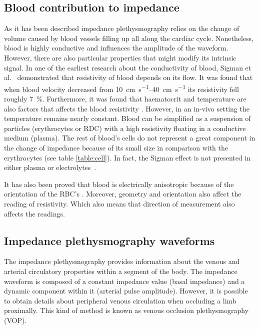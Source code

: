 \subsection{Blood contribution to impedance} %
As it has been described impedance plethysmography relies on the change of volume caused by blood vessels filling up all along the cardiac cycle. Nonetheless, blood is highly conductive and influences the amplitude of the waveform. However, there are also particular properties that might modify its intrinsic signal. In one of the earliest research about the conductivity of blood, Sigman et al.~\cite{sigman1937effect} demonstrated that resistivity of blood depends on its flow. It was found that when blood velocity decreased from \SIrange{10}{40}{\centi\meter\per\second} its resistivity fell roughly \SI{7}{\percent}. Furthermore, it was found that haematocrit and temperature are also factors that affects the blood resistivity \cite{yamakoshi1980noninvasive}. However, in an in-vivo setting the temperature remains nearly constant. Blood can be simplified as a suspension of particles (erythrocytes or RDC) with a high resistivity floating in a conductive medium (plasma). The rest of blood’s cells do not represent a great component in the change of impedance because of its small size in comparison with the erythrocytes (see table \ref{table:cell}). In fact, the Sigman effect is not presented in either plasma or electrolytes~\cite{tremper1990principles}.  

It has also been proved that blood is electrically anisotropic because of the orientation of the RBC’s \cite{Visser1992Electric}. Moreover, geometry and orientation also affect the reading of resistivity. Which also means that direction of measurement also affects the readings. 

\subsection{Impedance plethysmography waveforms}
\label{section iPG waveforms}
The impedance plethysmography provides information about the venous and arterial circulatory properties within a segment of the body. The impedance waveform is composed of a constant impedance value (basal impedance) and a dynamic component within it (arterial pulse amplitude). However, it is possible to obtain details about peripheral venous circulation when occluding a limb proximally. This kind of method is known as venous occlusion plethysmography (VOP).

